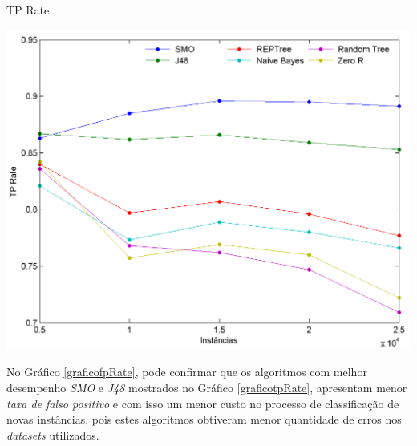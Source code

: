 \documentclass[
	12pt,				%
	openright,			%
	oneside,	
	a4paper,				%
	english,				%
	brazil				%
]{abntex2/abntex2} %
\begin{document}
\begin{grafico}[!htb]
	\caption{\label{graficotpRate} \fontsize{10}{\baselineskip} \selectfont TP Rate}
	\begin{center}
		\includegraphics[scale=0.6]{graphs/tp_graph.png}
	\end{center}
\end{grafico}

No Gráfico \ref{graficofpRate}, pode confirmar que os algoritmos com melhor desempenho \textit{SMO} e \textit{J48} mostrados no Gráfico \ref{graficotpRate}, apresentam menor \textit{taxa de falso positivo} e com isso um menor custo no processo de classificação de novas instâncias, pois estes algoritmos obtiveram menor quantidade de erros nos \textit{datasets} utilizados.
\end{document}
